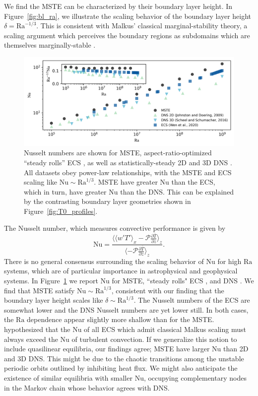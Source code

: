 \documentclass[reprint,amsmath,amssymb,aps,nofootinbib]{revtex4-1}
\newcommand\Ra{\mathrm{Ra}}
\newcommand\Nu{\mathrm{Nu}}
\begin{document}
We find the MSTE can be characterized by their boundary layer height.
In Figure~\ref{fig:bl_ra}, we illustrate the scaling behavior of the boundary layer height $\delta = \Ra^{-1/3}$. 
This is consistent with Malkus' classical marginal-stability theory, a scaling argument which perceives the boundary regions as subdomains which are themselves marginally-stable \cite{Malkus_1954}.

\begin{figure}
    \centering
    \includegraphics[width=7.1in]{nu_ra.PNG}
    \caption{Nusselt numbers are shown for MSTE, aspect-ratio-optimized ``steady rolls'' ECS \cite{Wen}, as well as statistically-steady 2D and 3D DNS \cite{Johnston, Scheel_2016}.
    All datasets obey power-law relationships, with the MSTE and ECS scaling like $\Nu \sim\Ra^{1/3}$. 
    MSTE have greater $\Nu$ than the ECS, which in turn, have greater $\Nu$ than the DNS. 
    This can be explained by the contrasting boundary layer geometries shown in Figure~\ref{fig:T0_profiles}.}%
    \label{fig:nu_vs_ra}%
\end{figure}

The Nusselt number, which measures convective performance is given by
\begin{equation}
    \Nu = \frac{\langle \langle w'T' \rangle_x - \mathcal{P}\frac{\partial \overline{T}}{\partial z} \rangle_z}{\langle- \mathcal{P}\frac{\partial \overline{T}}{\partial z} \rangle_z}.
\end{equation}
There is no general consensus surrounding the scaling behavior of $\Nu$ for high $\Ra$ systems, which are of particular importance in astrophysical and geophysical systems. In Figure~\ref{fig:nu_vs_ra} we report $\Nu$ for MSTE, ``steady rolls" ECS \cite{Wen}, and DNS \cite{Scheel_2016, Johnston}. 
We find that MSTE satisfy $\Nu \sim\Ra^{1/3}$, consistent with our finding that the boundary layer height scales like $\delta \sim \Ra^{1/3}$.
The Nusselt numbers of the ECS are somewhat lower and the DNS Nusselt numbers are yet lower still.
In both cases, the $\Ra$ dependence appear slightly more shallow than for the MSTE.
\cite{Wen} hypothesized that the $\Nu$ of all ECS which admit classical Malkus scaling must always exceed the $\Nu$ of turbulent convection.
If we generalize this notion to include quasilinear equilibria, our findings agree; MSTE have larger $\Nu$ than 2D and 3D DNS.
This might be due to the chaotic transitions among the unstable periodic orbits outlined by \cite{Yalniz, Cvitanovic} inhibiting heat flux. 
We might also anticipate the existence of similar equilibria with smaller $\Nu$, occupying complementary nodes in the Markov chain whose behavior agrees with DNS. 
\end{document}
